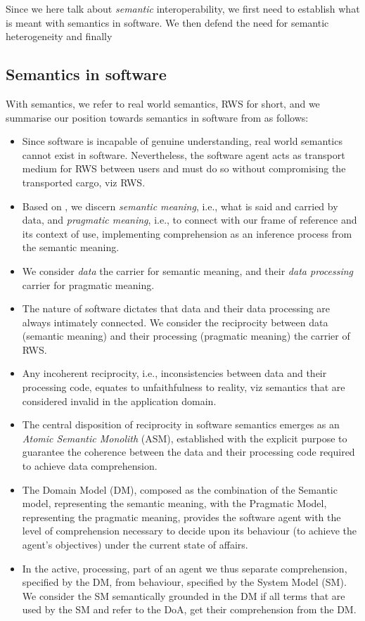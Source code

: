 \documentclass[sort&compress,preprint,authoryear,3p,twocolumn]{elsarticle}
\providecommand{\tightlist}{%
  \setlength{\itemsep}{0pt}\setlength{\parskip}{0pt}}
\begin{document}
Since we here talk about \emph{semantic} interoperability, we first need
to establish what is meant with semantics in software. We then defend
the need for semantic heterogeneity and finally

\hypertarget{semantics-in-software}{%
\subsection{Semantics in software}\label{semantics-in-software}}

With semantics, we refer to real world semantics, RWS for short, and we
summarise our position towards semantics in software from
\citep{Brandt2021a} as follows:

\begin{itemize}
\tightlist
\item
  Since software is incapable of genuine understanding, real world
  semantics cannot exist in software. Nevertheless, the software agent
  acts as transport medium for RWS between users and must do so without
  compromising the transported cargo, viz RWS.
\item
  Based on \citep{Grice:1991BT}, we discern \emph{semantic meaning},
  i.e., what is said and carried by data, and \emph{pragmatic meaning},
  i.e., to connect with our frame of reference and its context of use,
  implementing comprehension as an inference process from the semantic
  meaning.
\item
  We consider \emph{data} the carrier for semantic meaning, and their
  \emph{data processing} carrier for pragmatic meaning.
\item
  The nature of software dictates that data and their data processing
  are always intimately connected. We consider the reciprocity between
  data (semantic meaning) and their processing (pragmatic meaning) the
  carrier of RWS.
\item
  Any incoherent reciprocity, i.e., inconsistencies between data and
  their processing code, equates to unfaithfulness to reality, viz
  semantics that are considered invalid in the application domain.
\item
  The central disposition of reciprocity in software semantics emerges
  as an \emph{Atomic Semantic Monolith} (ASM), established with the
  explicit purpose to guarantee the coherence between the data and their
  processing code required to achieve data comprehension.
\item
  The Domain Model (DM), composed as the combination of the Semantic
  model, representing the semantic meaning, with the Pragmatic Model,
  representing the pragmatic meaning, provides the software agent with
  the level of comprehension necessary to decide upon its behaviour (to
  achieve the agent's objectives) under the current state of affairs.
\item
  In the active, processing, part of an agent we thus separate
  comprehension, specified by the DM, from behaviour, specified by the
  System Model (SM). We consider the SM semantically grounded in the DM
  if all terms that are used by the SM and refer to the DoA, get their
  comprehension from the DM.
\end{itemize}
\end{document}
